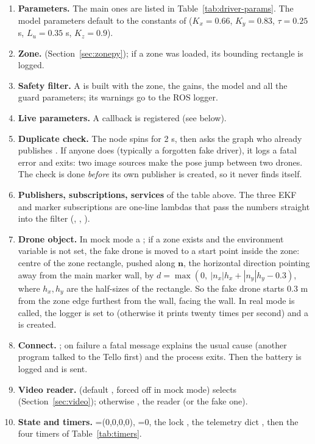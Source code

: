 \begin{enumerate}[leftmargin=*,itemsep=2pt]
\item \textbf{Parameters.} The main ones are listed in Table~\ref{tab:driver-params}. The model parameters default
to the constants of  ($K_x=0.66$, $K_y=0.83$, $\tau=0.25$ s, $L_u=0.35$ s, $K_z=0.9$).
\item \textbf{Zone.}  (Section~\ref{sec:zonepy}); if a zone was
loaded, its bounding rectangle is logged.
\item \textbf{Safety filter.} A  is built with the zone, the gains, the model and all the
guard parameters; its warnings go to the ROS logger.
\item \textbf{Live parameters.} A callback  is registered (see below).
\item \textbf{Duplicate check.} The node spins for 2 s, then asks the graph who already publishes
. If anyone does (typically a forgotten fake driver), it logs a fatal error and exits:
two image sources make the pose jump between two drones. The check is done \emph{before} its own publisher is
created, so it never finds itself.
\item \textbf{Publishers, subscriptions, services} of the table above. The three EKF and marker subscriptions are
one-line lambdas that pass the numbers straight into the filter (, ,
).
\item \textbf{Drone object.} In mock mode a ; if a zone exists and the
environment variable  is not set, the fake drone is moved to a start point inside the zone:
centre of the zone rectangle, pushed along $\bm n$, the horizontal direction pointing away from the main marker
wall, by $d=\max(0,\ |n_x|h_x+|n_y|h_y-0.3)$, where $h_x,h_y$ are the half-sizes of the rectangle. So the fake
drone starts 0.3 m from the zone edge furthest from the wall, facing the wall. In real mode
 is called, the  logger is set to  (otherwise it prints
 twenty times per second) and a  is created.
\item \textbf{Connect.} ; on failure a fatal message explains the usual cause (another
program talked to the Tello first) and the process exits. Then the battery is logged and  is sent.
\item \textbf{Video reader.}  (default , forced off in mock mode) selects
 (Section~\ref{sec:video}); otherwise , the 
reader (or the fake one).
\item \textbf{State and timers.} =(0,0,0,0), =0, the lock , the
telemetry dict , then the four timers of Table~\ref{tab:timers}.
\end{enumerate}

